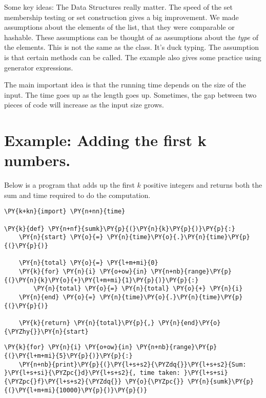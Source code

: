 Some key ideas:
The Data Structures really matter.  The speed of the set membership testing or set construction gives a big improvement.
We made assumptions about the elements of the list, that they were comparable or hashable.  These assumptions can be thought of as assumptions about the \emph{type} of the elements.  This is not the same as the class.  It's duck typing.  The assumption is that certain methods can be called.
The example also gives some practice using generator expressions.


The main important idea is that the running time depends on the size of the input.  The time goes up as the length goes up.
Sometimes, the gap between two pieces of code will increase as the input size grows.

\section{Example: Adding the first k numbers.}


Below is a program that adds up the first $k$ positive integers and returns both the sum and time required to do the computation.

\begin{Verbatim}[commandchars=\\\{\}]
\PY{k+kn}{import} \PY{n+nn}{time}

\PY{k}{def} \PY{n+nf}{sumk}\PY{p}{(}\PY{n}{k}\PY{p}{)}\PY{p}{:}
    \PY{n}{start} \PY{o}{=} \PY{n}{time}\PY{o}{.}\PY{n}{time}\PY{p}{(}\PY{p}{)}

    \PY{n}{total} \PY{o}{=} \PY{l+m+mi}{0}
    \PY{k}{for} \PY{n}{i} \PY{o+ow}{in} \PY{n+nb}{range}\PY{p}{(}\PY{n}{k}\PY{o}{+}\PY{l+m+mi}{1}\PY{p}{)}\PY{p}{:}
        \PY{n}{total} \PY{o}{=} \PY{n}{total} \PY{o}{+} \PY{n}{i}
    \PY{n}{end} \PY{o}{=} \PY{n}{time}\PY{o}{.}\PY{n}{time}\PY{p}{(}\PY{p}{)}

    \PY{k}{return} \PY{n}{total}\PY{p}{,} \PY{n}{end}\PY{o}{\PYZhy{}}\PY{n}{start}
\end{Verbatim}


\begin{Verbatim}[commandchars=\\\{\}]
\PY{k}{for} \PY{n}{i} \PY{o+ow}{in} \PY{n+nb}{range}\PY{p}{(}\PY{l+m+mi}{5}\PY{p}{)}\PY{p}{:}
    \PY{n+nb}{print}\PY{p}{(}\PY{l+s+s2}{\PYZdq{}}\PY{l+s+s2}{Sum: }\PY{l+s+si}{\PYZpc{}d}\PY{l+s+s2}{, time taken: }\PY{l+s+si}{\PYZpc{}f}\PY{l+s+s2}{\PYZdq{}} \PY{o}{\PYZpc{}} \PY{n}{sumk}\PY{p}{(}\PY{l+m+mi}{10000}\PY{p}{)}\PY{p}{)}
\end{Verbatim}




